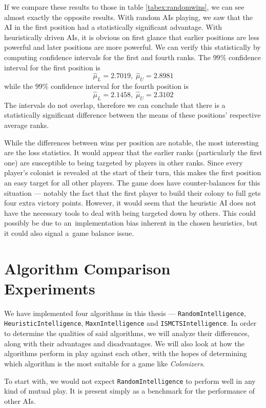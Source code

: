 If we compare these results to those in table \ref{tabex:randomwins}, we can see
almost exactly the opposite results. With random AIs playing, we saw that the AI
in the first position had a statistically significant advantage. With heuristically
driven AIs, it is obvious on first glance that earlier positions are less powerful
and later positions are more powerful. We can verify this statistically by computing
confidence intervals for the first and fourth ranks. The $99\%$ confidence interval
for the first position is
$$\hat \mu_L = 2.7019,\;\hat \mu_U = 2.8981$$
while the $99\%$ confidence interval for the fourth position is
$$\hat \mu_L = 2.1458,\;\hat \mu_U = 2.3102$$
The intervals do not overlap, therefore we can conclude that there is a statistically
significant difference between the means of these positions' respective average ranks.

While the differences between wins per position are notable, the most interesting
are the loss statistics. It would appear that the earlier ranks (particularly the first one)
are susceptible to being targeted by players in other ranks. Since every player's colonist
is revealed at the start of their turn, this makes the first position an easy target
for all other players. The game does have counter-balances for this situation ---
notably the fact that the first player to build their colony to full gets four extra
victory points. However, it would seem that the heuristic AI does not have the necessary
tools to deal with being targeted down by others. This could possibly be due to
an~implementation bias inherent in the chosen heuristics, but it could also signal
a~game balance issue.

\section{Algorithm Comparison Experiments}

We have implemented four algorithms in this thesis --- \texttt{RandomIntelligence},
\texttt{HeuristicIntelligence}, \texttt{MaxnIntelligence} and \texttt{ISMCTSIntelligence}.
In order to determine the qualities of said algorithms, we will analyze their differences,
along with their advantages and disadvantages. We will also look at how the algorithms
perform in play against each other, with the hopes of determining which algorithm
is the most suitable for a game like \emph{Colonizers}.

To start with, we would not expect \texttt{RandomIntelligence} to perform well in any
kind of mutual play. It is present simply as a benchmark for the performance of
other AIs.


